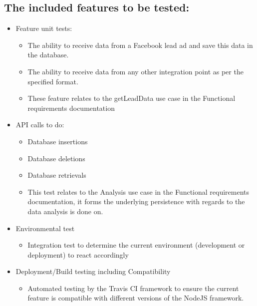 \documentclass{article}
\begin{document}
\subsection{The included features to be tested:}
\begin{itemize}
\item Feature unit tests:
	\begin{itemize}
	\item The ability to receive data from a Facebook lead ad and save this data in the database.
	\item The ability to receive data from any other integration point as per the specified format.
	\item These feature relates to the getLeadData use case in the Functional requirements documentation
	\end{itemize}
\item API calls to do:
	\begin{itemize}
	\item Database insertions 
	\item Database deletions 
	\item Database retrievals 
	\item This test relates to the Analysis use case in the Functional requirements documentation, it forms the underlying persistence with regards to the data analysis is done on.
	\end{itemize}
\item Environmental test
	\begin{itemize}
	\item Integration test to determine the current environment (development or deployment) to react accordingly 
	\end{itemize}
\item Deployment/Build testing including Compatibility
		\begin{itemize}
	\item Automated testing by the Travis CI framework to ensure the current feature is compatible with different versions of the NodeJS framework. 
	\end{itemize}
\end{itemize}
\end{document}
